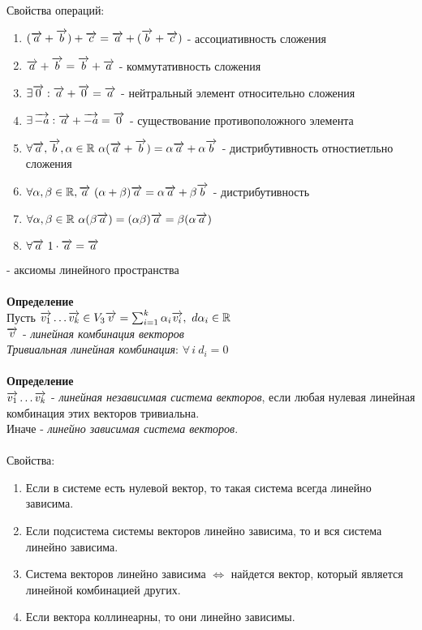 \documentclass[12pt]{article}
\begin{document}
Свойства операций:
\begin{enumerate}
    \item $(\overrightarrow{a}+\overrightarrow{b})+\overrightarrow{c} = \overrightarrow{a}+(\overrightarrow{b}+\overrightarrow{c})$ - ассоциативность сложения
    \item $\overrightarrow{a}+\overrightarrow{b} = \overrightarrow{b}+\overrightarrow{a}$ - коммутативность сложения
    \item $\exists \overrightarrow{0}: \overrightarrow{a}+\overrightarrow{0} = \overrightarrow{a}$ - нейтральный элемент относительно сложения
    \item $\exists\, \overrightarrow{-a}: \overrightarrow{a}+\overrightarrow{-a} = \overrightarrow{0}$ - существование противоположного элемента
    \item $\forall \vect{a},\vect{b}, \alpha \in \mathbb{R}\ \alpha(\vect{a}+\vect{b})=\alpha\vect{a}+\alpha\vect{b}$ - дистрибутивность отностиетльно сложения
    \item $\forall \alpha, \beta \in \mathbb{R}, \overrightarrow{a}\ (\alpha+\beta)\overrightarrow{a} = \alpha\overrightarrow{a}+\beta\overrightarrow{b}$ - дистрибутивность
    \item $\forall \alpha,\beta \in \mathbb{R}\  \alpha(\beta\overrightarrow{a})=(\alpha\beta)\overrightarrow{a}=\beta(\alpha\overrightarrow{a})$
    \item $\forall\vect{a}\ 1\cdot\vect{a}=\vect{a}$
\end{enumerate} - аксиомы линейного пространства\\\\
\textbf{Определение}\\
Пусть $\overrightarrow{v_1}\ldots\overrightarrow{v_k} \in V_3\\
\overrightarrow{v}=\sum_{i=1}^{k}\alpha_i\overrightarrow{v_i},\ d\alpha_i\in \mathbb{R}$\\
$\overrightarrow{v}$ - \textit{линейная комбинация векторов}\\
\textit{Тривиальная линейная комбинация}: $\forall\,i\ d_i=0$\\\\
\textbf{Определение}\\
$\overrightarrow{v_1}\ldots\overrightarrow{v_k}$ - \textit{линейная независимая система векторов}, если любая нулевая линейная комбинация этих векторов тривиальна.\\
Иначе - \textit{линейно зависимая система векторов}.\\\\
Свойства:
\begin{enumerate}
    \item Если в системе есть нулевой вектор, то такая система всегда линейно зависима.
    \item Если подсистема системы векторов линейно зависима, то и вся система линейно зависима.
    \item Система векторов линейно зависима $\Leftrightarrow$ найдется вектор, который является линейной комбинацией других.
    \item Если вектора коллинеарны, то они линейно зависимы.
\end{enumerate}
\end{document}
